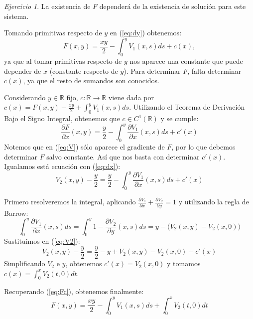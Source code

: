 \documentclass[12pt,spanish]{article}
\theoremstyle{definition}
\theoremstyle{remark}
\newtheorem{exercise}{Ejercicio}
\begin{document}
\begin{exercise}
La existencia de $F$ dependerá de la existencia de solución para este
sistema.

Tomando primitivas respecto de $y$ en (\ref{eq:dy}) obtenemos:
\begin{equation} \label{eq:Fc}
  F(x,y)=\frac{xy}{2}-\int_0^y V_1(x,s)ds+c(x),
\end{equation}
ya que al tomar primitivas respecto de $y$ nos aparece una constante
que puede depender de $x$ (constante respecto de $y$). Para determinar
$F$, falta determinar $c(x)$, ya que el resto de sumandos son
conocidos.

Considerando $y\in\mathbb{R}$ fijo,
$c:\mathbb{R}\rightarrow\mathbb{R}$ viene dada por
$c(x)=F(x,y)-\frac{xy}{2}+\int_0^y V_1(x,s)ds$. Utilizando el Teorema
de Derivación Bajo el Signo Integral, obtenemos que
$c\in C^1(\mathbb{R})$ y se cumple:
\[\frac{\partial F}{\partial x}(x,y)=\frac{y}{2}-\int_0^y
  \frac{\partial V_1}{\partial x}(x,s)ds+c'(x)\] Notemos que en
(\ref{eq:V}) sólo aparece el gradiente de $F$, por lo que debemos
determinar $F$ salvo constante. Así que nos basta con determinar
$c'(x)$. Igualamos está ecuación con (\ref{eq:dx}):
\begin{equation} \label{eq:V2}
  V_2(x,y)-\frac{y}{2}=\frac{y}{2}-\int_0^y
  \frac{\partial V_1}{\partial x}(x,s)ds+c'(x)
\end{equation}

Primero resolveremos la integral, aplicando
$\frac{\partial V_1}{\partial x}+\frac{\partial V_2}{\partial y}=1$ y
utilizando la regla de Barrow:
\begin{equation} \label{eq:int}
  \int_0^y \frac{\partial V_1}{\partial x}(x,s)ds=\int_0^y
  1-\frac{\partial V_2}{\partial y}(x,s)ds=y-\big(V_2(x,y)-V_2(x,0)\big)
\end{equation}
Sustituimos en (\ref{eq:V2}):
\begin{equation} \label{eq:c'}
  V_2(x,y)-\frac{y}{2}=\frac{y}{2}-y+V_2(x,y)-V_2(x,0)+c'(x)
\end{equation}
Simplificando $V_2$ e $y$, obtenemos $c'(x)=V_2(x,0)$ y tomamos
$c(x)=\int_0^x V_2(t,0)dt$.

Recuperando (\ref{eq:Fc}), obtenemos finalmente:
\begin{equation}
  \label{eq:F}
  F(x,y)=\frac{xy}{2}-\int_0^y V_1(x,s)ds+\int_0^x V_2(t,0)dt
\end{equation}


\end{exercise}
\end{document}
